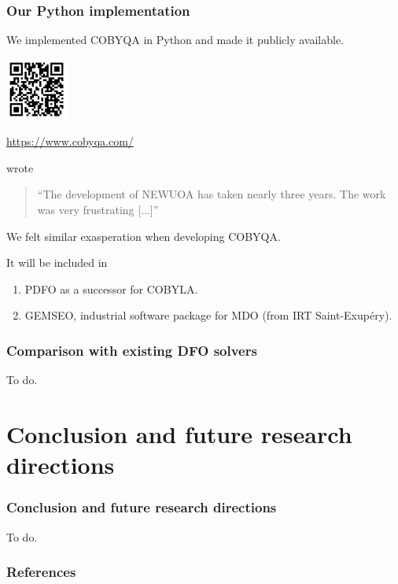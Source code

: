 \documentclass{polyu-presentation}
\begin{document}
\begin{frame}
    \frametitle{Our Python implementation}

    We implemented COBYQA in \alert{Python} and made it \alert{publicly available}.
    
	\begin{center}
        \href{https://www.cobyqa.com/}{\includegraphics[width=0.8in]{images/qr/cobyqa.png}}

        \scriptsize\url{https://www.cobyqa.com/}
    \end{center}

    \begin{block}{}
        \textcite{Powell_2006} wrote
        \begin{quote}
            \enquote{The development of NEWUOA has taken nearly three years. The work was very frustrating [...]}
        \end{quote}
        We felt similar exasperation when developing COBYQA.
    \end{block}

    It will be included in
    \begin{enumerate}
        \item PDFO as a successor for COBYLA.
        \item GEMSEO, industrial software package for MDO (from IRT Saint-Exup{\'{e}}ry).
    \end{enumerate}
\end{frame}

\begin{frame}
    \frametitle{Comparison with existing DFO solvers}
    
	To do.
\end{frame}

\section{Conclusion and future research directions}

\begin{frame}
    \frametitle{Conclusion and future research directions}

	To do.
\end{frame}

\appendix

\begin{frame}[t,allowframebreaks]
    \frametitle{References}

	\printbibliography
\end{frame}
\end{document}
